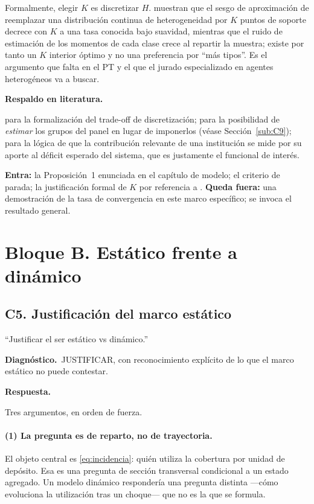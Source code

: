 \documentclass[11pt]{article}
\newcommand{\diag}[1]{\par\noindent\textbf{Diagn\'ostico.}\ #1\par}
\newcommand{\resp}{\par\noindent\textbf{Respuesta.}\par}
\newcommand{\lit}{\par\noindent\textbf{Respaldo en literatura.}\par}
\theoremstyle{definition}
\begin{document}
Formalmente, elegir $K$ es discretizar $H$. \citet{bonhomme2022} muestran que el
sesgo de aproximaci\'on de reemplazar una distribuci\'on continua de
heterogeneidad por $K$ puntos de soporte decrece con $K$ a una tasa conocida
bajo suavidad, mientras que el ruido de estimaci\'on de los momentos de cada
clase crece al repartir la muestra; existe por tanto un $K$ interior \'optimo y no
una preferencia por ``m\'as tipos''. Es el argumento que falta en el PT y el que
el jurado especializado en agentes heterog\'eneos va a buscar.

\lit
\citet{bonhomme2022} para la formalizaci\'on del trade-off de discretizaci\'on;
\citet{bonhommemanresa2015} para la posibilidad de \emph{estimar} los grupos del
panel en lugar de imponerlos (v\'ease Secci\'on~\ref{sub:C9});
\citet{acharya2017systemic} para la l\'ogica de que la contribuci\'on relevante de
una instituci\'on se mide por su aporte al d\'eficit esperado del sistema, que es
justamente el funcional de inter\'es.

\begin{ie2}
\textbf{Entra:} la Proposici\'on~1 enunciada en el cap\'itulo de modelo; el criterio
de parada; la justificaci\'on formal de $K$ por referencia a
\citet{bonhomme2022}.
\textbf{Queda fuera:} una demostraci\'on de la tasa de convergencia en este marco
espec\'ifico; se invoca el resultado general.
\end{ie2}

\section{Bloque B. Est\'atico frente a din\'amico}

\subsection{C5. Justificaci\'on del marco est\'atico}\label{sub:C5}

\begin{jurado}
``Justificar el ser est\'atico vs din\'amico.''
\end{jurado}

\diag{JUSTIFICAR, con reconocimiento expl\'icito de lo que el marco est\'atico no
puede contestar.}

\resp
Tres argumentos, en orden de fuerza.

\paragraph{(1) La pregunta es de reparto, no de trayectoria.} El objeto central
es \eqref{eq:incidencia}: qui\'en utiliza la cobertura por unidad de dep\'osito.
Esa es una pregunta de secci\'on transversal condicional a un estado agregado. Un
modelo din\'amico responder\'ia una pregunta distinta ---c\'omo evoluciona la
utilizaci\'on tras un choque--- que no es la que se formula.
\end{document}
